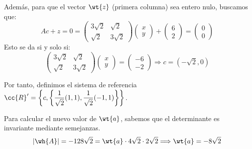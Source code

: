\begin{ejercicio}
\begin{enumerate}
        Además, para que el vector $\wt{z}$ (primera columna) sea entero nulo, buscamos que:
        \begin{equation*}
            Ac + z = 0
            =  \left(\begin{array}{cc}
                3\sqrt{2} & \sqrt{2} \\
                \sqrt{2} & 3\sqrt{2}
            \end{array}\right)\left(\begin{array}{c}
                x\\y
            \end{array}\right) + \left(\begin{array}{c}
                6 \\ 2
            \end{array}\right) = \left(\begin{array}{c}
                0\\0
            \end{array}\right)
        \end{equation*}
        Esto se da si y solo si:
        \begin{equation*}
            \left(\begin{array}{cc}
                3\sqrt{2} & \sqrt{2} \\
                \sqrt{2} & 3\sqrt{2}
            \end{array}\right)\left(\begin{array}{c}
                x\\y
            \end{array}\right) = \left(\begin{array}{c}
                -6 \\ -2
            \end{array}\right) \Longrightarrow c=\left(-\sqrt{2}, 0\right)
        \end{equation*}

        Por tanto, definimos el sistema de referencia $\cc{R}'=\left\{c, \left\{\dfrac{1}{\sqrt{2}}(1,1), \dfrac{1}{\sqrt{2}}(-1,1)\right\}\right\}$.

        Para calcular el nuevo valor de $\wt{a}$, sabemos que el determinante es invariante mediante semejanzas.
        \begin{equation*}
            |\wh{A}|=-128\sqrt{2}= \wt{a}\cdot 4\sqrt{2}\cdot 2\sqrt{2}\Longrightarrow \wt{a}=-8\sqrt{2}
        \end{equation*}
        

\end{enumerate}
\end{ejercicio}
